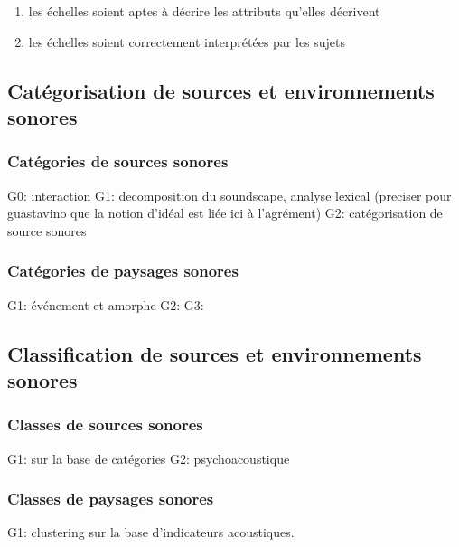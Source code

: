 \begin{enumerate}
\item les échelles soient aptes à décrire les attributs qu'elles décrivent
\item les échelles soient correctement interprétées par les sujets
\end{enumerate}

\subsection{Catégorisation de sources et environnements sonores}

\subsubsection{Catégories de sources sonores}

G0: \citep{gaver1993world} interaction
G1: \citep{guastavino2006ideal,szeremeta2009analysis} decomposition du soundscape, analyse lexical (preciser pour guastavino que la notion d'idéal est liée ici à l'agrément)
G2: \citep{Houix03f,guastavino2007categorization,gygi2007similarity,houix_lexical_2012} catégorisation de source sonores

\subsubsection{Catégories de paysages sonores}

G1: \citep{maffiolo_caracterisation_1999} événement et amorphe
G2: \citep{jeon2013soundwalk}
G3: \citep{brown2011towards}

\subsection{Classification de sources et environnements sonores}

\subsubsection{Classes de sources sonores}

G1: \citep{niessen2010categories,park14} sur la base de catégories
G2: \citep{yang2013psychoacoustical} psychoacoustique

\subsubsection{Classes de paysages sonores}

G1: \citep{rychtarikova2013soundscape,torija2013application} clustering sur la base d'indicateurs acoustiques.

